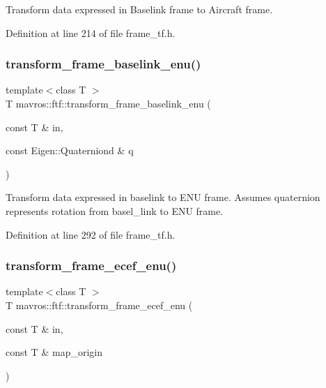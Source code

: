 Transform data expressed in Baselink frame to Aircraft frame. 



Definition at line 214 of file frame\+\_\+tf.\+h.

\mbox{\label{group__nodelib_ga59326acc337daa1ce44d56ee6acff76b}} 
\subsubsection{\texorpdfstring{transform\_frame\_baselink\_enu()}{transform\_frame\_baselink\_enu()}}
{\footnotesize\ttfamily template$<$class T $>$ \\
T mavros\+::ftf\+::transform\+\_\+frame\+\_\+baselink\+\_\+enu (\begin{DoxyParamCaption}\item[{const T \&}]{in,  }\item[{const Eigen\+::\+Quaterniond \&}]{q }\end{DoxyParamCaption})\hspace{0.3cm}{\ttfamily [inline]}}



Transform data expressed in baselink to E\+NU frame. Assumes quaternion represents rotation from basel\+\_\+link to E\+NU frame. 



Definition at line 292 of file frame\+\_\+tf.\+h.

\mbox{\label{group__nodelib_gaa1d1407cbddfd1481e147680e92acab8}} 
\subsubsection{\texorpdfstring{transform\_frame\_ecef\_enu()}{transform\_frame\_ecef\_enu()}}
{\footnotesize\ttfamily template$<$class T $>$ \\
T mavros\+::ftf\+::transform\+\_\+frame\+\_\+ecef\+\_\+enu (\begin{DoxyParamCaption}\item[{const T \&}]{in,  }\item[{const T \&}]{map\+\_\+origin }\end{DoxyParamCaption})\hspace{0.3cm}{\ttfamily [inline]}}



